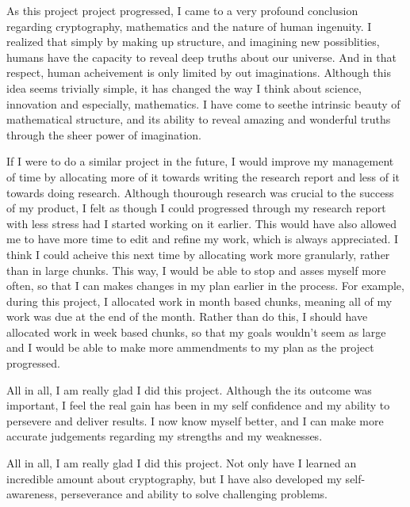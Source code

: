 \documentclass[12pt, a4paper, draft]{report}
\begin{document}
As this project project progressed, I came to a very profound
conclusion regarding cryptography, mathematics and the nature of
human ingenuity. I realized that simply by making up structure, and
imagining new possiblities, humans have the capacity to reveal
deep truths about our universe. And in that respect, human acheivement
is only limited by out imaginations. Although this idea seems trivially
simple, it has changed the way I think about science, innovation and
especially, mathematics. I have come to seethe intrinsic beauty of
mathematical structure, and its ability to reveal amazing and wonderful
truths through the sheer power of imagination.

If I were to do a similar project in the future, I would improve my
management of time by allocating more of it towards writing the
research report and less of it towards doing research. Although
thourough research was crucial to the success of my product, I felt
as though I could progressed through my research report with less
stress had I started working on it earlier. This would have also
allowed me to have more time to edit and refine my work, which is
always appreciated. I think I could acheive this next time by allocating
work more granularly, rather than in large chunks. This way, I would
be able to stop and asses myself more often, so that I can makes
changes in my plan earlier in the process. For example, during
this project, I allocated work in month based chunks, meaning all
of my work was due at the end of the month. Rather than do this,
I should have allocated work in week based chunks, so that my
goals wouldn't seem as large and I would be able to make more
ammendments to my plan as the project progressed.

All in all, I am really glad I did this project. Although the
its outcome was important, I feel the real gain has been in my
self confidence and my ability to persevere and deliver results.
I now know myself better, and I can make more accurate judgements
regarding my strengths and my weaknesses.

All in all, I am really glad I did this project. Not only have
I learned an incredible amount about cryptography, but I have
also developed my self-awareness, perseverance and ability
to solve challenging problems.
\end{document}
